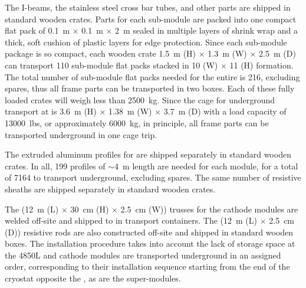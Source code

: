 The   I-beams, the stainless steel cross bar tubes, and other parts are shipped in standard wooden crates.  Parts for each sub-module are packed into one compact flat pack of \SI{0.1}{\m} $\times$ \SI{0.1}{\m} $\times$ \SI{2}{\m} sealed in multiple layers of shrink wrap and a thick, soft cushion of plastic layers for edge protection. 
Since each sub-module package is so compact, each wooden crate \SI{1.5}{\m} (H) $\times$ \SI{1.3}{\m} (W) $\times$ \SI{2.5}{\m} (D) can transport \num{110} sub-module flat packs stacked in \num{10} (W) $\times$ \num{11} (H) formation.
The total number of sub-module flat packs needed for the entire  is \num{216}, excluding spares, thus all  frame parts can be transported in two boxes. 
Each of these fully loaded crates %
will weigh less than \SI{2500}{\kg}.
Since the cage for underground transport at  is 
\SI{3.6}{\m} (H) $\times$ \SI{1.38}{\m} (W) $\times$ \SI{3.7}{\m} (D) with a load capacity of \SI{13000}{lbs}, or approximately \SI{6000}{\kg}, in principle, all  frame parts can be transported underground %
in one cage trip. 

The extruded aluminum profiles for  are shipped separately in  standard wooden crates. In all, \num{199} profiles of $\sim$\SI{4}{\m} length are needed for each \tpcheight {} module, for a total of %
\num{7164} to transport %
underground, excluding spares. The same number of resistive sheaths are %
shipped separately in standard wooden crates. %

The (\SI{12}{\m} (L) $\times$ \SI{30}{\cm} (H) $\times$ \SI{2.5}{\cm} (W)) trusses for the cathode modules  are welded off-site and shipped to  in transport containers. 
The (\SI{12}{\m} (L) $\times$ \SI{2.5}{\cm} (D)) resistive rods are also constructed off-site and shipped in standard wooden boxes. %
The installation procedure takes into account the lack of storage space at the 4850L and cathode modules are transported underground in an assigned order, corresponding to their installation sequence starting from  %
the end of the cryostat opposite the , as are the  super-modules.  

